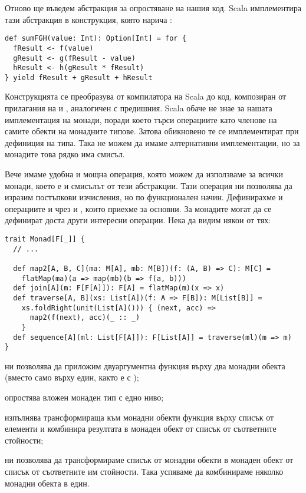 Отново ще въведем абстракция за опростяване на нашия код. Scala имплементира тази абстракция в конструкция, която нарича :

\begin{lstlisting}
def sumFGH(value: Int): Option[Int] = for {
  fResult <- f(value)
  gResult <- g(fResult - value)
  hResult <- h(gResult * fResult)
} yield fResult + gResult + hResult
\end{lstlisting}

Конструкцията  се преобразува от компилатора на Scala до код, композиран от прилагания на  и , аналогичен с предишния. Scala обаче не знае за нашата имплементация на монади, поради което търси операциите като членове на самите обекти на монадните типове. Затова обикновено те се имплементират при дефиниция на типа. Така не можем да имаме алтернативни имплементации, но за монадите това рядко има смисъл.

Вече имаме удобна и мощна операция, която можем да използваме за всички монади, което е и смисълът от тези абстракции. Тази операция ни позволява да изразим постъпкови изчисления, но по функционален начин. Дефинирахме и операциите  и  чрез  и , които приехме за основни. За монадите могат да се дефинират доста други интересни операции. Нека да видим някои от тях:

\begin{lstlisting}
trait Monad[F[_]] {
  // ...
  
  def map2[A, B, C](ma: M[A], mb: M[B])(f: (A, B) => C): M[C] =
    flatMap(ma)(a => map(mb)(b => f(a, b)))
  def join[A](m: F[F[A]]): F[A] = flatMap(m)(x => x)
  def traverse[A, B](xs: List[A])(f: A => F[B]): M[List[B]] =
    xs.foldRight(unit(List[A]())) { (next, acc) =>
      map2(f(next), acc)(_ :: _)
    }
  def sequence[A](ml: List[F[A]]): F[List[A]] = traverse(ml)(m => m)
}
\end{lstlisting}

\begin{itemize*}
  \item {} ни позволява да приложим двуаргументна функция върху два монадни обекта (вместо само върху един, както е с );
  \item {} опростява вложен монаден тип с едно ниво;
  \item {} изпълнява трансформираща към монадни обекти функция върху списък от елементи и комбинира резултата в монаден обект от списък от съответните стойности;
  \item {} ни позволява да трансформираме списък от монадни обекти в монаден обект от списък от съответните им стойности. Така успяваме да комбинираме няколко монадни обекта в един.
\end{itemize*}

